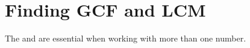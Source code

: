 \documentclass[12pt]{book}
\begin{document}









  \twosidedpaper
  \section{Finding GCF and LCM}

  The  and  
  are essential when working with more than one number.  
\end{document}
